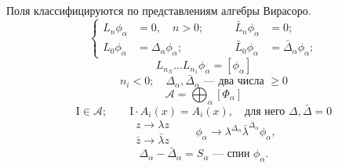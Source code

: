 Поля классифицируются по представлениям алгебры Вирасоро.
\begin{equation*}
\left\{\begin{aligned}
L_n\phi_\alpha&=0,\quad n>0;&\qquad\bar L_n\phi_\alpha&=0;\\
L_0\phi_\alpha&=\Delta_\alpha\phi_\alpha;&\qquad
\bar L_0\phi_\alpha&=\bar\Delta_\alpha\phi_\alpha;
\end{aligned}\right.
\tag{26}
\end{equation*}
\begin{equation*}
L_{n_N}\ldots L_{n_1}\phi_\alpha=[\phi_\alpha]
\end{equation*}
\begin{equation*}
n_i<0;\quad\Delta_\alpha,\bar\Delta_\alpha\text{ — два числа }\geq0
\end{equation*}
\begin{equation*}
\mathcal A=\bigoplus_\alpha[\Phi_\alpha]
\end{equation*}
\begin{equation*}
\mathrm I\in\mathcal A;\qquad\mathrm I\cdot A_i(x)=A_i(x),\quad
\text{для него }\Delta,\bar\Delta=0
\end{equation*}
\begin{equation*}
\begin{gathered}
z\to\lambda z\\
\bar z\to\bar\lambda z
\end{gathered}
\qquad\phi_\alpha\to\lambda^{\Delta_\alpha}\bar\lambda^{\bar\Delta_\alpha}\phi_\alpha,
\end{equation*}
\begin{equation*}
\Delta_\alpha-\bar\Delta_\alpha=S_\alpha\text{ — спин }\phi_\alpha.
\end{equation*}


